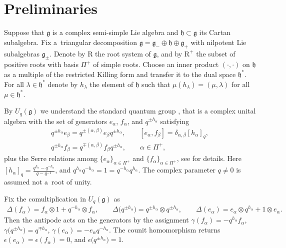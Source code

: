 \documentclass[pdftex]{sigma}
\numberwithin{equation}{section}
\begin{document}
\section{Preliminaries}\label{SecPrelim}
Suppose that $\mathfrak{g}$ is a complex semi-simple Lie algebra and $\mathfrak{h}\subset \mathfrak{g}$ its Cartan subalgebra. Fix a~triangular decomposition $\mathfrak{g}=\mathfrak{g}_-\oplus \mathfrak{h}\oplus \mathfrak{g}_+$ with nilpotent Lie subalgebras $\mathfrak{g}_\pm$. Denote by $\mathrm{R}$ the root system of $\mathfrak{g}$, and by $\mathrm{R}^+$ the subset of positive roots with basis $\Pi^+$ of simple roots. Choose an inner product $(\cdot,\cdot)$ on $\mathfrak{h}$ as a multiple of the restricted Killing form and transfer it to the dual space $\mathfrak{h}^*$. For all $\lambda\in \mathfrak{h}^*$ denote by $h_\lambda$ the element of $\mathfrak{h}$ such that $\mu(h_\lambda)=(\mu,\lambda)$ for all $\mu\in \mathfrak{h}^*$.

By $U_q(\mathfrak{g})$ we understand the standard quantum group \cite{ChP, D3}, that is a complex unital algebra with the set of generators $e_\alpha$, $f_\alpha$, and $q^{\pm h_\alpha}$ satisfying
\begin{gather*}
q^{\pm h_\alpha}e_\beta=q^{\pm (\alpha,\beta)}e_\beta q^{\pm h_\alpha}, \qquad [e_\alpha,f_\beta]=\delta_{\alpha,\beta}[h_\alpha]_q,\\
q^{\pm h_\alpha}f_\beta=q^{\mp (\alpha,\beta)}f_\beta q^{\pm h_\alpha},\qquad \alpha \in \Pi^+,
\end{gather*}
plus the Serre relations among $\{e_\alpha\}_{\alpha\in \Pi^+}$ and $\{f_\alpha\}_{\alpha\in \Pi^+}$, see \cite{ChP} for details. Here $[h_\alpha]_q=\frac{q^{h_\alpha}-q^{-h_\alpha}}{q-q^{-1}}$, and $q^{h_\alpha}q^{-h_\alpha}=1=q^{-h_\alpha}q^{h_\alpha}$. The complex parameter $q\not =0$ is assumed not a~root of unity.

Fix the comultiplication in $U_q(\mathfrak{g})$ as
\begin{gather*}
\Delta(f_\alpha)= f_\alpha\otimes 1+q^{-h_\alpha}\otimes f_\alpha,\qquad\!\! \Delta\big(q^{\pm h_\alpha}\big)=q^{\pm h_\alpha}\otimes q^{\pm h_\alpha},\qquad\!\!\Delta(e_\alpha)= e_\alpha\otimes q^{h_\alpha}+1\otimes e_\alpha.
\end{gather*}
Then the antipode acts on the generators by the assignment $\gamma( f_\alpha)=- q^{h_\alpha}f_\alpha$, $\gamma\big( q^{\pm h_\alpha}\big)=q^{\mp h_\alpha}$, $\gamma( e_\alpha)=- e_\alpha q^{-h_\alpha}$. The counit homomorphism returns $\epsilon(e_\alpha)=\epsilon(f_\alpha)=0$, and $\epsilon\big(q^{\pm h_\alpha}\big)=1$.
\end{document}
